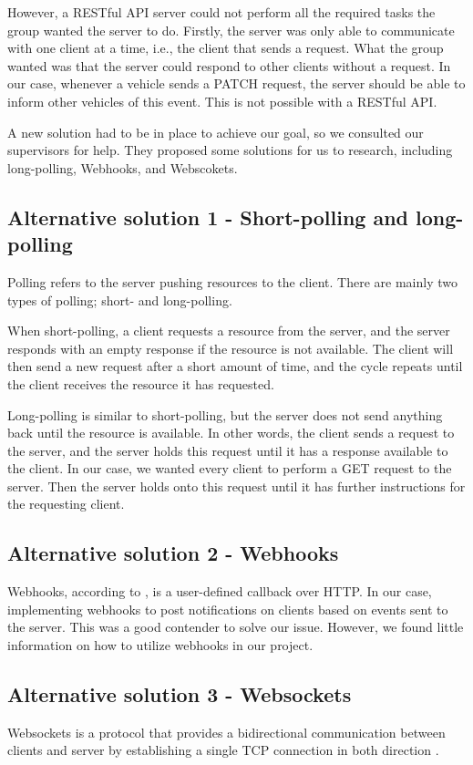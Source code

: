 However, a RESTful API server could not perform all the required tasks the group wanted the server to do. Firstly, the server was only able to communicate with one client at a time, i.e., the client that sends a request. What the group wanted was that the server could respond to other clients without a request. In our case, whenever a vehicle sends a PATCH request, the server should be able to inform other vehicles of this event. This is not possible with a RESTful API.

A new solution had to be in place to achieve our goal, so we consulted our supervisors for help. They proposed some solutions for us to research, including long-polling, Webhooks, and Webscokets.

\subsection{Alternative solution 1 - Short-polling and long-polling}
Polling refers to the server pushing resources to the client. There are mainly two types of polling; short- and long-polling. 

When short-polling, a client requests a resource from the server, and the server responds with an empty response if the resource is not available. The client will then send a new request after a short amount of time, and the cycle repeats until the client receives the resource it has requested.

Long-polling is similar to short-polling, but the server does not send anything back until the resource is available. In other words, the client sends a request to the server, and the server holds this request until it has a response available to the client. In our case, we wanted every client to perform a GET request to the server. Then the server holds onto this request until it has further instructions for the requesting client.

\subsection{Alternative solution 2 - Webhooks}
Webhooks, according to \cite{webhooks}, is a user-defined callback over HTTP. In our case, implementing webhooks to post notifications on clients based on events sent to the server. This was a good contender to solve our issue. However, we found little information on how to utilize webhooks in our project. 

\subsection{Alternative solution 3 - Websockets}
Websockets is a protocol that provides a bidirectional communication between clients and server by establishing a single TCP connection in both direction \parencite{rfc_websockets}.  
